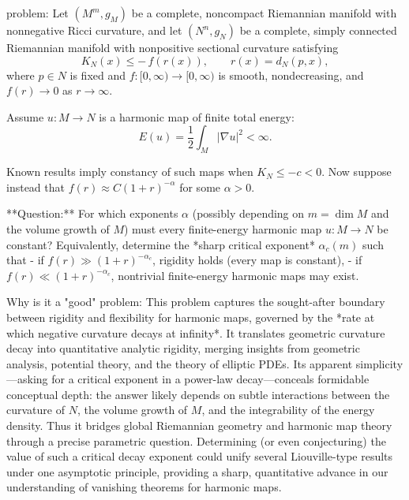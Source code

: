 problem:  
Let \((M^m,g_M)\) be a complete, noncompact Riemannian manifold with nonnegative Ricci curvature, and let \((N^n,g_N)\) be a complete, simply connected Riemannian manifold with nonpositive sectional curvature satisfying  
\[
K_N(x) \le -\,f(r(x)), \qquad r(x)=d_N(p,x),
\]  
where \(p\in N\) is fixed and \(f:[0,\infty)\to[0,\infty)\) is smooth, nondecreasing, and \(f(r)\to0\) as \(r\to\infty\).  

Assume \(u:M\to N\) is a harmonic map of finite total energy:  
\[
E(u)=\frac12\int_M |\nabla u|^2 <\infty.
\]  

Known results imply constancy of such maps when \(K_N\le -c<0\).  
Now suppose instead that \(f(r)\approx C(1+r)^{-\alpha}\) for some \(\alpha>0\).  

**Question:**  
For which exponents \(\alpha\) (possibly depending on \(m=\dim M\) and the volume growth of \(M\)) must every finite-energy harmonic map \(u:M\to N\) be constant?  
Equivalently, determine the *sharp critical exponent* \(\alpha_c(m)\) such that  
- if \(f(r)\gg (1+r)^{-\alpha_c}\), rigidity holds (every map is constant),  
- if \(f(r)\ll (1+r)^{-\alpha_c}\), nontrivial finite-energy harmonic maps may exist.  

Why is it a "good" problem:  
This problem captures the sought-after boundary between rigidity and flexibility for harmonic maps, governed by the *rate at which negative curvature decays at infinity*. It translates geometric curvature decay into quantitative analytic rigidity, merging insights from geometric analysis, potential theory, and the theory of elliptic PDEs. Its apparent simplicity—asking for a critical exponent in a power-law decay—conceals formidable conceptual depth: the answer likely depends on subtle interactions between the curvature of \(N\), the volume growth of \(M\), and the integrability of the energy density. Thus it bridges global Riemannian geometry and harmonic map theory through a precise parametric question. Determining (or even conjecturing) the value of such a critical decay exponent could unify several Liouville-type results under one asymptotic principle, providing a sharp, quantitative advance in our understanding of vanishing theorems for harmonic maps.